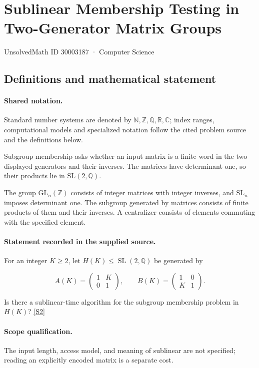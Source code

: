 \documentclass[11pt]{article}
\newcommand{\sref}[2]{\hyperlink{source:#1:#2}{[S#2]}}
\begin{document}
\setcounter{section}{30003186}
\section{Sublinear Membership Testing in Two-Generator Matrix Groups}\label{30003187}
{\small\sffamily UnsolvedMath ID 30003187 · Computer Science}
\subsection{Definitions and mathematical statement}

\paragraph{Shared notation.}Standard number systems are denoted by $\mathbb N,\mathbb Z,\mathbb Q,\mathbb R,\mathbb C$; index ranges, computational models and specialized notation follow the cited problem source and the definitions below.


Subgroup membership asks whether an input matrix is a finite word in the two displayed generators and their inverses. The matrices have determinant one, so their products lie in $\mathrm{SL}(2,\mathbb Q)$.

The group $\mathrm{GL}_n(\mathbb Z)$ consists of integer matrices with integer inverses, and $\mathrm{SL}_n$ imposes determinant one. The subgroup generated by matrices consists of finite products of them and their inverses. A centralizer consists of elements commuting with the specified element.
\paragraph{Statement recorded in the supplied source.}
For an integer $K\geq2$, let $H(K)\leq\operatorname{SL}(2,\mathbb Q)$ be generated by

$$A(K)=\begin{pmatrix}1&K\\0&1\end{pmatrix},\qquad B(K)=\begin{pmatrix}1&0\\K&1\end{pmatrix}.$$

Is there a sublinear-time algorithm for the subgroup membership problem in $H(K)$? \sref{30003187}{2}
\paragraph{Scope qualification.}
The input length, access model, and meaning of sublinear are not specified; reading an explicitly encoded matrix is a separate cost.
\end{document}
